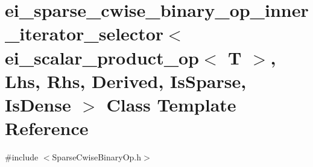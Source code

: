 \hypertarget{classei__sparse__cwise__binary__op__inner__iterator__selector_3_01ei__scalar__product__op_3_01_t68443256ad4d0dcd15264ea9d6adeadd}{\section{ei\-\_\-sparse\-\_\-cwise\-\_\-binary\-\_\-op\-\_\-inner\-\_\-iterator\-\_\-selector$<$ ei\-\_\-scalar\-\_\-product\-\_\-op$<$ T $>$, Lhs, Rhs, Derived, Is\-Sparse, Is\-Dense $>$ Class Template Reference}
\label{classei__sparse__cwise__binary__op__inner__iterator__selector_3_01ei__scalar__product__op_3_01_t68443256ad4d0dcd15264ea9d6adeadd}
}


{\ttfamily \#include $<$Sparse\-Cwise\-Binary\-Op.\-h$>$}


